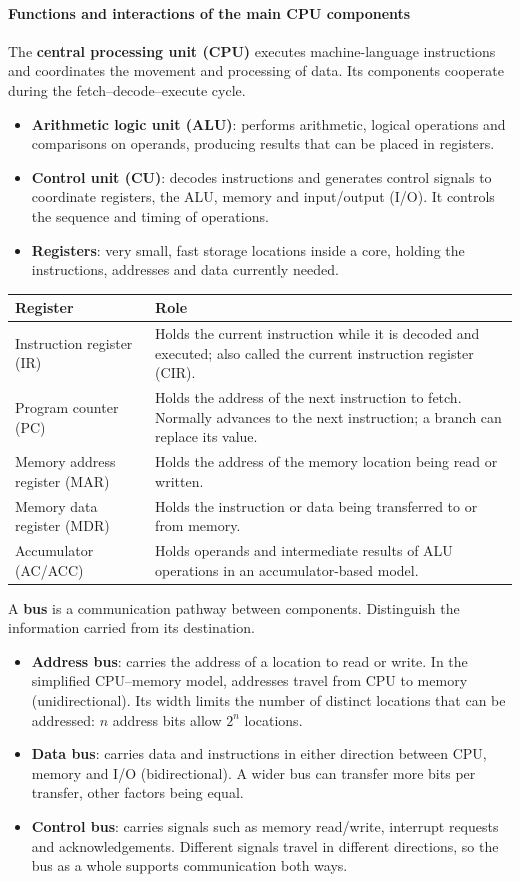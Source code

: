 \documentclass[a4paper,12pt]{article}
\begin{document}
\paragraph{Functions and interactions of the main CPU components}
The \textbf{central processing unit (CPU)} executes machine-language instructions and coordinates the movement and processing of data. Its components cooperate during the fetch--decode--execute cycle.
\begin{itemize}
    \item \textbf{Arithmetic logic unit (ALU)}: performs arithmetic, logical operations and comparisons on operands, producing results that can be placed in registers.
    \item \textbf{Control unit (CU)}: decodes instructions and generates control signals to coordinate registers, the ALU, memory and input/output (I/O). It controls the sequence and timing of operations.
    \item \textbf{Registers}: very small, fast storage locations inside a core, holding the instructions, addresses and data currently needed.
\end{itemize}
\begin{center}
\begin{tabularx}{0.98\linewidth}{l X}
\toprule
\textbf{Register} & \textbf{Role} \\
\midrule
Instruction register (IR) & Holds the current instruction while it is decoded and executed; also called the current instruction register (CIR). \\
Program counter (PC) & Holds the address of the next instruction to fetch. Normally advances to the next instruction; a branch can replace its value. \\
Memory address register (MAR) & Holds the address of the memory location being read or written. \\
Memory data register (MDR) & Holds the instruction or data being transferred to or from memory. \\
Accumulator (AC/ACC) & Holds operands and intermediate results of ALU operations in an accumulator-based model. \\
\bottomrule
\end{tabularx}
\end{center}
A \textbf{bus} is a communication pathway between components. Distinguish the information carried from its destination.
\begin{itemize}
    \item \textbf{Address bus}: carries the address of a location to read or write. In the simplified CPU--memory model, addresses travel from CPU to memory (unidirectional). Its width limits the number of distinct locations that can be addressed: $n$ address bits allow $2^n$ locations.
    \item \textbf{Data bus}: carries data and instructions in either direction between CPU, memory and I/O (bidirectional). A wider bus can transfer more bits per transfer, other factors being equal.
    \item \textbf{Control bus}: carries signals such as memory read/write, interrupt requests and acknowledgements. Different signals travel in different directions, so the bus as a whole supports communication both ways.
\end{itemize}
\end{document}

